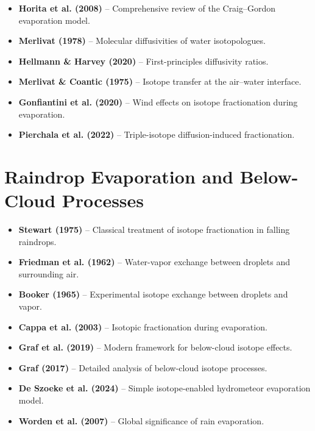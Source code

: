 \documentclass[11pt,a4paper]{article}
\begin{document}

\begin{itemize}
    \item \textbf{Horita et al. (2008)} -- Comprehensive review of the Craig--Gordon evaporation model.
    \item \textbf{Merlivat (1978)} -- Molecular diffusivities of water isotopologues.
    \item \textbf{Hellmann \& Harvey (2020)} -- First-principles diffusivity ratios.
    \item \textbf{Merlivat \& Coantic (1975)} -- Isotope transfer at the air--water interface.
    \item \textbf{Gonfiantini et al. (2020)} -- Wind effects on isotope fractionation during evaporation.
    \item \textbf{Pierchala et al. (2022)} -- Triple-isotope diffusion-induced fractionation.
\end{itemize}

\section{Raindrop Evaporation and Below-Cloud Processes}


\begin{itemize}
    \item \textbf{Stewart (1975)} -- Classical treatment of isotope fractionation in falling raindrops.
    \item \textbf{Friedman et al. (1962)} -- Water-vapor exchange between droplets and surrounding air.
    \item \textbf{Booker (1965)} -- Experimental isotope exchange between droplets and vapor.
    \item \textbf{Cappa et al. (2003)} -- Isotopic fractionation during evaporation.
    \item \textbf{Graf et al. (2019)} -- Modern framework for below-cloud isotope effects.
    \item \textbf{Graf (2017)} -- Detailed analysis of below-cloud isotope processes.
    \item \textbf{De Szoeke et al. (2024)} -- Simple isotope-enabled hydrometeor evaporation model.
    \item \textbf{Worden et al. (2007)} -- Global significance of rain evaporation.
\end{itemize}
\end{document}
